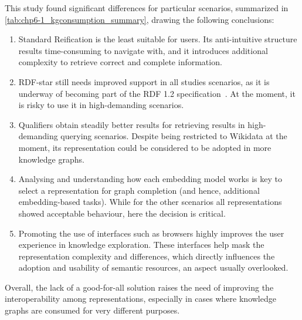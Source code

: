 This study found significant differences for particular scenarios, summarized in \cref{tab:chp6-1_kgconsumption_summary}, drawing the following conclusions: 
\begin{enumerate}
    \item Standard Reification is the least suitable for users. Its anti-intuitive structure results time-consuming to navigate with, and it introduces additional complexity to retrieve correct and complete information.
    \item RDF-star still needs improved support in all studies scenarios, as it is underway of becoming part of the RDF 1.2 specification~\parencite{hartig2023rdf}. At the moment, it is risky to use it in high-demanding scenarios.
    \item Qualifiers obtain steadily better results for retrieving results in high-demanding querying scenarios. Despite being restricted to Wikidata at the moment, its representation could be considered to be adopted in more knowledge graphs.
    \item Analysing and understanding how each embedding model works is key to select a representation for graph completion (and hence, additional embedding-based tasks). While for the other scenarios all representations showed acceptable behaviour, here the decision is critical.
    \item Promoting the use of interfaces such as browsers highly improves the user experience in knowledge exploration. These interfaces help mask the representation complexity and differences, which directly influences the adoption and usability of semantic resources, an aspect usually overlooked.
\end{enumerate}

Overall, the lack of a good-for-all solution raises the need of improving the interoperability among representations, especially in cases where knowledge graphs are consumed for very different purposes.

